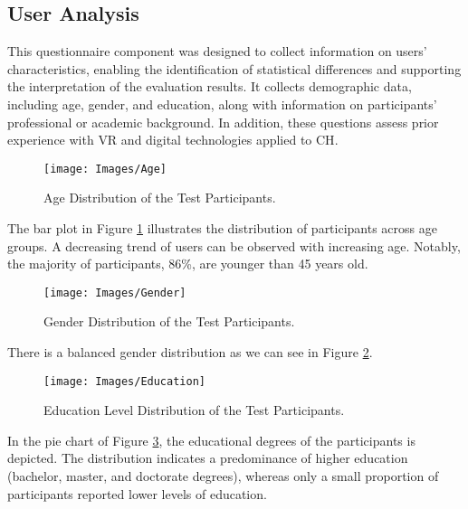 \subsection{User Analysis}
This questionnaire component was designed to collect information on users' characteristics, enabling the identification of statistical differences and supporting the interpretation of the evaluation results. It collects demographic data, including age, gender, and education, along with information on participants' professional or academic background. 
In addition, these questions assess prior experience with \gls{VR} and digital technologies applied to \gls{CH}.

\begin{figure}[h!]
    \centering
    \texttt{[image: Images/Age]}
    \caption{Age Distribution of the Test Participants.} 
    \label{fig:age}
\end{figure}

The bar plot in Figure \ref{fig:age} illustrates the distribution of participants across age groups. A decreasing trend of users can be observed with increasing age. Notably, the majority of participants, 86\%, are younger than 45 years old.

\begin{figure}[h!]
    \centering
    \texttt{[image: Images/Gender]}
    \caption{Gender Distribution of the Test Participants.} 
    \label{fig:gender}
\end{figure}

There is a balanced gender distribution as we can see in Figure \ref{fig:gender}.

\begin{figure}[h!]
    \centering
    \texttt{[image: Images/Education]}
    \caption{Education Level Distribution of the Test Participants.} 
    \label{fig:education}
\end{figure}

In the pie chart of Figure \ref{fig:education}, the educational degrees of the participants is depicted. 
The distribution indicates a predominance of higher education (bachelor, master, and doctorate degrees), whereas only a small proportion of participants reported lower levels of education.


